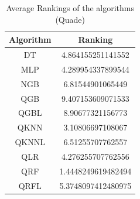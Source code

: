 \documentclass[a4paper,3p,sort&compress]{elsarticle}
\begin{document}
\begin{table}[tbp]
  \centering \footnotesize
  \caption{\label{tab:quade}Average Rankings of the algorithms (Quade)}
  \begin{tabular}{c|c}
    Algorithm&Ranking\\
    \hline
    DT&4.864155251141552\\
    MLP&4.289954337899544\\
    NGB&6.81544901065449\\
    QGB&9.407153609071533\\
    QGBL&8.90677321156773\\
    QKNN&3.10806697108067\\
    QKNNL&6.51255707762557\\
    QLR&4.276255707762556\\
    QRF&1.4448249619482494\\
    QRFL&5.3748097412480975\\
    \end{tabular}
\end{table}



\end{document}
